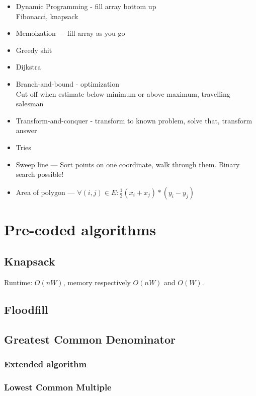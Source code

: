 \documentclass[10pt,hidelinks]{article}
\begin{document}
\begin{itemize}
\item Dynamic Programming - fill array bottom up \\
	Fibonacci, knapsack
\item Memoization --- fill array as you go
\item Greedy shit
\item Dijkstra
\item Branch-and-bound - optimization \\
	Cut off when estimate below minimum or above maximum, travelling salesman
\item Transform-and-conquer - transform to known problem, solve that, transform answer
\item Tries
\item Sweep line --- Sort points on one coordinate, walk through them. Binary search possible!
\item Area of polygon --- $\forall (i, j) \in E: \frac12 (x_i+x_j)*(y_i-y_j)$
\end{itemize}

\pagebreak

\section{Pre-coded algorithms}

\subsection{Knapsack}
Runtime: $O(nW)$, memory respectively $O(nW)$ and $O(W)$.


\subsection{Floodfill}


\subsection{Greatest Common Denominator}


\subsubsection{Extended algorithm}


\subsubsection{Lowest Common Multiple}

\end{document}
